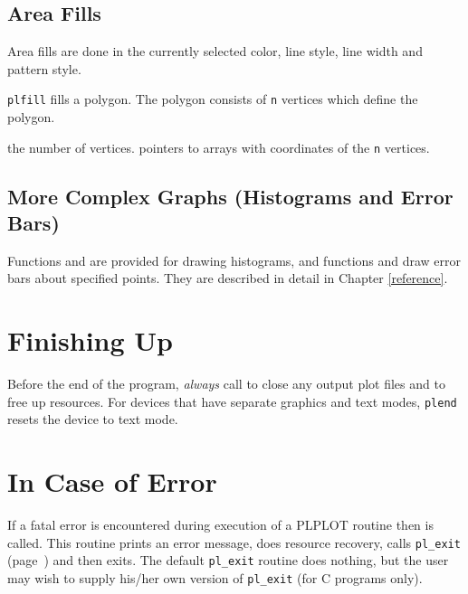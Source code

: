 \subsection {Area Fills}

Area fills are done in
the currently selected color, line style, line width and pattern style.

{\tt plfill} fills a polygon. The polygon consists of {\tt n}
vertices which define the polygon.

{the number of vertices.}
{pointers to arrays with coordinates of the {\tt n} vertices.}


\subsection {More Complex Graphs (Histograms and Error Bars)}

Functions  and  are provided for
drawing histograms, and functions 
and  draw error bars about specified
points. They are described in detail in Chapter \ref{reference}.


\section {Finishing Up}

Before the end of the program, {\em always\/} call  to close any
output plot files and to free up resources.  For devices that have separate
graphics and text modes, {\tt plend} resets the device to text mode. 


\section {In Case of Error}

If a fatal error is encountered during execution of a PLPLOT routine then
 is called. This routine prints an error message, does resource
recovery, calls {\tt pl\_exit} (page~\pageref{plxexit}) and then exits. The
default {\tt pl\_exit} routine does nothing, but the user may wish to
supply his/her own version of {\tt pl\_exit} (for C programs only). 
